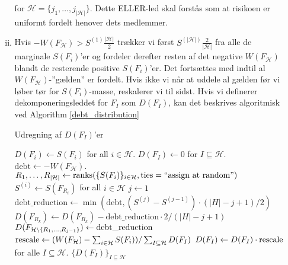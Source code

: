 \documentclass[a4paper, 12pt]{article}
\begin{document}
\begin{enumerate}
\begin{enumerate}[(i)]
\begin{equation}
\end{equation}
for $\mathcal H=\{j_1, \dots, j_{|\mathcal H|}\}$. Dette ELLER-led skal forstås som at risikoen er uniformt fordelt henover dets medlemmer.
\item
Hvis $-W(F_{\mathcal H})> S^{(1)}\frac{|\mathcal H|}{2}$ trækker vi først $S^{(|\mathcal H|)}\frac{2}{|\mathcal H|}$ fra alle de marginale $S(F_i)$'er og fordeler derefter resten af det negative $W(F_{\mathcal H})$ blandt de resterende positive $S(F_i)$'er. Det fortsættes med indtil al $W(F_{\mathcal H})$-''gælden'' er fordelt. Hvis ikke vi når at uddele al gælden før vi løber tør for $S(F_i)$-masse, reskalerer vi til sidst. Hvis vi definerer dekomponeringsleddet for $F_I$ som $D(F_I)$, kan det beskrives algoritmisk ved Algorithm \ref{debt_distribution}
\begin{algorithm}
\caption{Udregning af $D(F_I)$'er}\label{debt_distribution}
\begin{algorithmic}[1]
\State $D(F_i)\gets S(F_i)$ for all $i\in \mathcal H$.
\State $D(F_I)\gets 0$ for $I\subseteq \mathcal H$.
\State $\text{debt}\gets -W(F_{\mathcal H})$.
\State $R_1, \dots, R_{|\mathcal H|} \gets \textup{ranks}(\{S(F_i)\}_{i\in \mathcal H}, \textup{ties}=\textup{``assign at random''})$
\State $S^{(i)}\gets S(F_{R_i})$ for all $i\in \mathcal H$
\State $j \gets 1$
\State $\text{debt\_reduction}\gets \min(\text{debt}, (S^{(j)}-S^{(j-1)})\cdot (|H|-j+1)/2 )$
\State $D(F_{R_k}) \gets D(F_{R_k}) - \text{debt\_reduction}\cdot 2/(|H|-j+1)$
\EndFor
\State $D(F_{\mathcal H\setminus \{ R_1, \dots, R_{j-1} \}}) \gets \textup{debt\_reduction}$
\EndWhile
{}
\State $\textup{rescale} \gets   (W(F_{\mathcal H})- \sum_{i\in \mathcal H} S(F_i))/ \sum_{I\subseteq \mathcal H} D(F_I)$
\State $D(F_I) \gets D(F_I)\cdot \textup{rescale}$ for alle $I\subseteq \mathcal H$.
\EndIf
\State \Return $\{D(F_I)\}_{I\subseteq \mathcal H}$
\EndProcedure
\end{algorithmic}
\end{algorithm}
\end{enumerate}
 
\end{enumerate}
\end{document}
